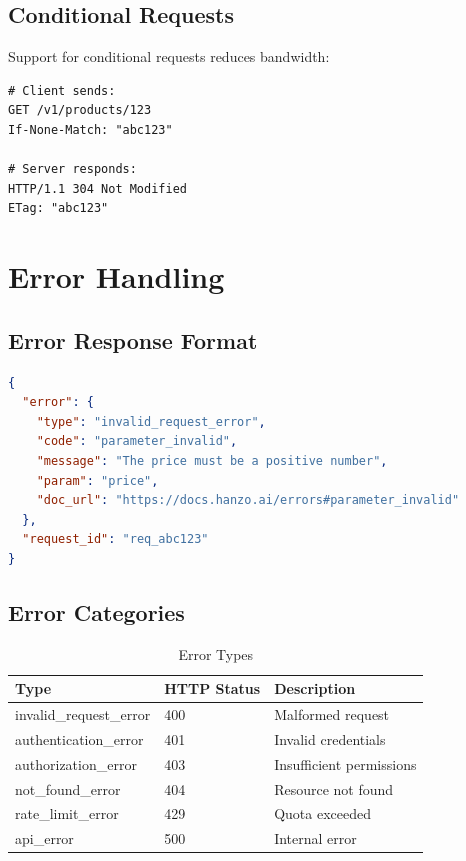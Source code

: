 \documentclass[11pt,a4paper]{article}
\begin{document}
\subsection{Conditional Requests}

Support for conditional requests reduces bandwidth:

\begin{lstlisting}[caption=Conditional Request]
# Client sends:
GET /v1/products/123
If-None-Match: "abc123"

# Server responds:
HTTP/1.1 304 Not Modified
ETag: "abc123"
\end{lstlisting}

\section{Error Handling}

\subsection{Error Response Format}

\begin{lstlisting}[language=json, caption=Error Response]
{
  "error": {
    "type": "invalid_request_error",
    "code": "parameter_invalid",
    "message": "The price must be a positive number",
    "param": "price",
    "doc_url": "https://docs.hanzo.ai/errors#parameter_invalid"
  },
  "request_id": "req_abc123"
}
\end{lstlisting}

\subsection{Error Categories}

\begin{table}[h]
\centering
\caption{Error Types}
\begin{tabular}{lll}
\toprule
\textbf{Type} & \textbf{HTTP Status} & \textbf{Description} \\
\midrule
invalid\_request\_error & 400 & Malformed request \\
authentication\_error & 401 & Invalid credentials \\
authorization\_error & 403 & Insufficient permissions \\
not\_found\_error & 404 & Resource not found \\
rate\_limit\_error & 429 & Quota exceeded \\
api\_error & 500 & Internal error \\
\bottomrule
\end{tabular}
\end{table}
\end{document}
